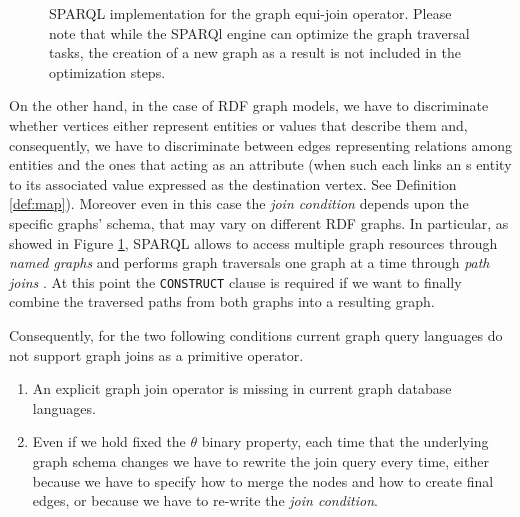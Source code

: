 \begin{description}
	\begin{figure}[!p]
	    \begin{minipage}[t]{\textwidth}
	      
	      \caption{SPARQL implementation for the graph equi-join operator. Please note that while the SPARQl engine can optimize the graph traversal tasks, the creation of a new graph as a result is not included in the optimization steps.}
	      \label{fig:SparqlEquiJoin}
	    \end{minipage}
	\end{figure}
	On the other hand, in the case of RDF graph models, we have to discriminate whether vertices either represent entities or
	values that describe them and, consequently, we have to discriminate between edges representing
	relations among entities and the ones that acting as an attribute (when such each links an s entity to its associated value
	expressed as the destination vertex. See Definition \vref{def:map}).
	Moreover even in this case the \textit{join condition} depends upon the specific graphs' schema,
	that may vary on different RDF graphs. In particular, as showed in Figure \ref{fig:SparqlEquiJoin}, SPARQL allows to access multiple graph resources
	through \textit{named graphs} and performs graph traversals one graph at a time through
	\textit{path joins} \cite{Fletcher09,Atre,Yuan}.
	At this point the \texttt{CONSTRUCT} clause is required if we
	want to finally combine the traversed paths from both graphs into a resulting graph.

	Consequently, for the two following conditions current graph query languages do not support
	graph joins as a primitive operator.
	\begin{enumerate}
		\item An explicit graph join operator is missing in current graph database languages.
		\item Even if we hold fixed the $\theta$ binary property, each time that the underlying graph schema
		changes we have to rewrite the join query every time, either because we have to specify how to merge
		the nodes and how to create final edges, or because we have to re-write the \textit{join condition}.
	\end{enumerate}
\end{description}

